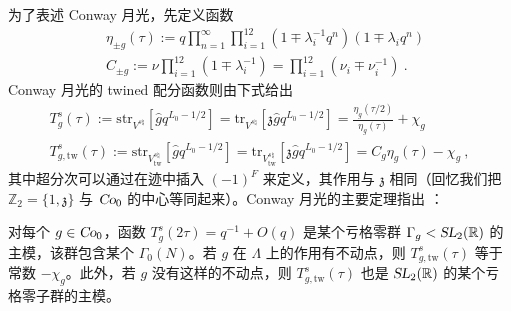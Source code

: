\documentclass[11pt,a4paper,fontset=windows]{ctexart}
\numberwithin{equation}{section}
\newcommand{\SL}{\operatorname{\textsl{SL}}}      %
\newcommand{\Co}{\operatorname{\textsl{Co}}}      %
\newcommand{\RR}{\mathbb{R}}
\newcommand{\ZZ}{\mathbb{Z}}
\begin{document}
为了表述 Conway 月光，先定义函数
\begin{equation}
\label{eta_g_and_C_g}
\begin{split}
&\eta_{\pm g}(\tau):=q\prod_{n=1}^{\infty}\prod_{i=1}^{12}\left(1\mp\lambda_i^{-1}q^n\right)\left(1\mp\lambda_iq^n\right) \\
&C_{\pm g}:=\nu\prod_{i=1}^{12}\left(1\mp\lambda_i^{-1}\right)=\prod_{i=1}^{12}\left(\nu_i\mp\nu_i^{-1}\right)~.
\end{split}
\end{equation}
Conway 月光的 twined 配分函数则由下式给出
\begin{equation}
\begin{split}
T^s_g(\tau):=\text{str}_{V^{s\natural}}\left[\hat{g}q^{L_0-1/2}\right]=\text{tr}_{V^{s\natural}}\left[\mathfrak{z}\hat{g}q^{L_0-1/2}\right]=\frac{\eta_g(\tau/2)}{\eta_g(\tau)}+\chi_g \\
T^s_{g,\text{tw}}(\tau):=\text{str}_{V^{s\natural}_{\text{tw}}}\left[\hat{g}q^{L_0-1/2}\right]=\text{tr}_{V^{s\natural}_{\text{tw}}}\left[\mathfrak{z}\hat{g}q^{L_0-1/2}\right]=C_g\eta_g(\tau)-\chi_g~,
\end{split}
\end{equation}
其中超分次可以通过在迹中插入 $(-1)^F$ 来定义，其作用与 $\mathfrak{z}$ 相同（回忆我们把 $\ZZ_2=\lbrace1,\mathfrak{z}\rbrace$ 与 $\Co_0$ 的中心等同起来）。Conway 月光的主要定理指出 \cite{DuncanJohnf.r.2015TMMF}：



{\thm  \label{thm:conway_moonshine} 对每个 $g\in\Co_0$，函数 $T_g^s(2\tau)=q^{-1}+O(q)$ 是某个亏格零群 $\Gamma_g<\SL_2(\RR)$ 的主模，该群包含某个 $\Gamma_0(N)$。若 $g$ 在 $\Lambda$ 上的作用有不动点，则 $T^s_{g,\text{tw}}(\tau)$ 等于常数 $-\chi_g$。此外，若 $g$ 没有这样的不动点，则 $T^s_{g,\text{tw}}(\tau)$ 也是 $\SL_2(\mathbb{R})$ 的某个亏格零子群的主模。}\\
\end{document}
